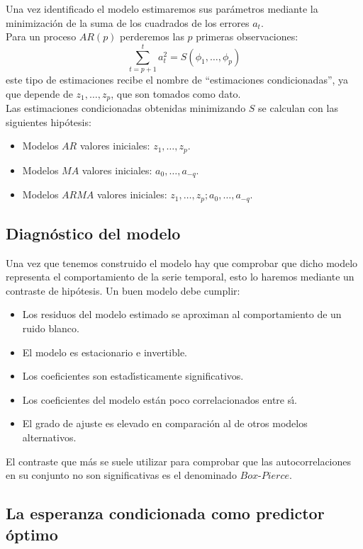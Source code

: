 Una vez identificado el modelo estimaremos sus par\'ametros mediante
la mi\-ni\-mi\-za\-ci\'on de la suma de los cuadrados de los errores $a_t$.\\

Para un proceso $AR(p)$ perderemos las $p$ primeras observaciones:
\begin{displaymath}
\sum_{t=p+1}^t a_t^2=S(\phi_1,\dots,\phi_p)
\end{displaymath}
este tipo de estimaciones recibe el nombre de ``estimaciones condicionadas'',
ya que depende de $z_1,\dots,z_p$, que son tomados como dato.\\

Las estimaciones condicionadas obtenidas minimizando $S$ se calculan con las
siguientes hip\'otesis:
\begin{itemize}
\item Modelos $AR$ valores iniciales: $z_1,\dots,z_p$.
\item Modelos $MA$ valores iniciales: $a_0,\dots,a_{-q}$.
\item Modelos $ARMA$ valores iniciales: $z_1,\dots,z_p;a_0,\dots,a_{-q}$.
\end{itemize}
%
\newpage
%
\subsection{Diagn\'ostico del modelo}

Una vez que tenemos construido el modelo hay que comprobar que dicho modelo
representa el comportamiento de la serie temporal, esto lo haremos mediante un
contraste de hip\'otesis. Un buen modelo debe cumplir:
\begin{itemize}
\item Los residuos del modelo estimado se aproximan al comportamiento de un
ruido blanco.
\item El modelo es estacionario e invertible.
\item Los coeficientes son estad\'{\i}sticamente significativos.
\item Los coeficientes del modelo est\'an poco correlacionados entre s\'{\i}.
\item El grado de ajuste es elevado en comparaci\'on al de otros modelos
alternativos.
\end{itemize}
El contraste que m\'as se suele utilizar para comprobar que las
autocorrelaciones en su conjunto no son significativas es el denominado
$Box$-$Pierce$.

\subsection{La esperanza condicionada como predictor \'optimo}

